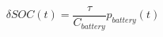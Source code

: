 \begin{equation}
	\delta SOC(t) = \frac{\tau}{C_{battery}}p_{battery}(t)
	\label{ch2:equ:soc-equation-from-battery-power}
\end{equation}
